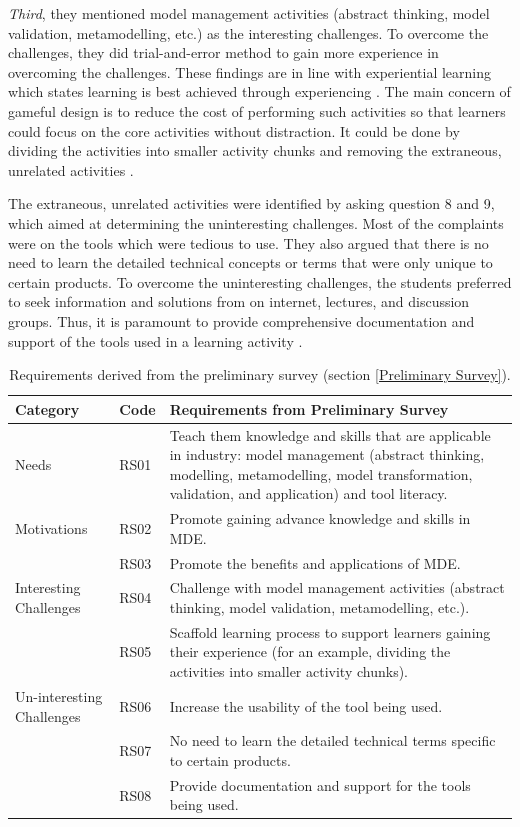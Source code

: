 \documentclass[12pt, a4paper]{report}
\begin{document}
{\textit{Third}, they mentioned model management activities (abstract thinking, model validation, metamodelling, etc.) as the interesting challenges. To overcome the challenges, they did trial-and-error method to gain more experience in overcoming the challenges. These findings are in line with experiential learning which states learning is best achieved through experiencing \cite{kolb2014experiential}. The main concern of gameful design is to reduce the cost of performing such activities so that learners could focus on the core activities without distraction. It could be done by dividing the activities into smaller activity chunks and removing the extraneous, unrelated activities \cite{deterding2015lens}. 

The extraneous, unrelated activities were identified by asking question 8 and 9, which aimed at determining the uninteresting challenges. Most of the complaints were on the tools which were tedious to use. They also argued that there is no need to learn the detailed technical concepts or terms that were only unique to certain products. To overcome the uninteresting challenges, the students preferred to seek information and solutions from on internet, lectures, and discussion groups. Thus, it is paramount to provide comprehensive documentation and support of the tools used in a learning activity \cite{liebel2015ready}. 

\begin{table}[ht]
\caption{Requirements derived from the preliminary survey (section \ref{Preliminary Survey}).}
\label{table:preliminary-survey}
\begin{center}
\begin{tabular}{ p{2cm}p{1cm}p{10cm} } 
\hline
Category & Code & Requirements from Preliminary Survey \\
\hline
\multirow{1}{2cm}{Needs} 
& RS01 & Teach them knowledge and skills that are applicable in industry: model management (abstract thinking, modelling, metamodelling, model transformation, validation, and application) and tool literacy. \\ 
\hline
\multirow{1}{2cm}{Motivations}
& RS02 & Promote gaining advance knowledge and skills in MDE. \\ 
& RS03 & Promote the benefits and applications of MDE. \\ 
\hline
\multirow{1}{2cm}{Interesting Challenges}
& RS04 & Challenge with model management activities (abstract thinking, model validation, metamodelling, etc.). \\ 
& RS05 & Scaffold learning process to support learners gaining their experience (for an example, dividing the activities into smaller activity chunks). \\ 
\hline
\multirow{1}{2cm}{Un-interesting Challenges}
& RS06 & Increase the usability of the tool being used. \\ 
& RS07 & No need to learn the detailed technical terms specific to certain products. \\ 
& RS08 & Provide documentation and support for the tools being used. \\ 
\hline
\end{tabular}
\end{center}
\end{table}

}
\end{document}
